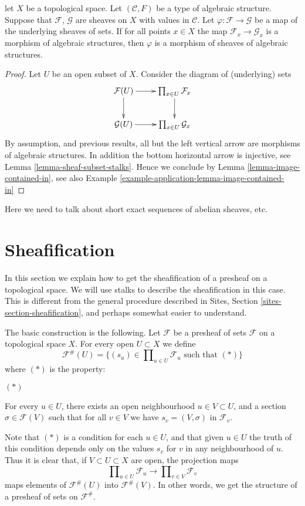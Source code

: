 \begin{lemma}
\label{lemma-check-homomorphism-stalks}
let $X$ be a topological space.
Let $(\mathcal{C}, F)$ be a type of algebraic structure.
Suppose that $\mathcal{F}$, $\mathcal{G}$ are sheaves on $X$
with values in $\mathcal{C}$.
Let $\varphi : \mathcal{F} \to \mathcal{G}$
be a map of the underlying sheaves of sets.
If for all points $x \in X$ the map
$\mathcal{F}_x \to \mathcal{G}_x$
is a morphism of algebraic structures,
then $\varphi$ is a morphism of sheaves of algebraic structures.
\end{lemma}

\begin{proof}
Let $U$ be an open subset of $X$. Consider the diagram of
(underlying) sets
$$
\xymatrix{
\mathcal{F}(U) \ar[r] \ar[d] &
\prod_{x \in U} \mathcal{F}_x \ar[d] \\
\mathcal{G}(U) \ar[r] &
\prod_{x \in U} \mathcal{G}_x
}
$$
By assumption, and previous results, all but the left vertical
arrow are morphisms of algebraic structures. In addition the
bottom horizontal arrow is injective,
see Lemma \ref{lemma-sheaf-subset-stalks}.
Hence we conclude by Lemma \ref{lemma-image-contained-in},
see also Example \ref{example-application-lemma-image-contained-in}
\end{proof}

\noindent
Here we need to talk about short exact sequences of abelian sheaves, etc.




\section{Sheafification}
\label{section-sheafification}

\noindent
In this section we explain how to get the sheafification
of a presheaf on a topological space. We will use stalks
to describe the sheafification in this case. This is different
from the general procedure described in Sites, Section
\ref{sites-section-sheafification}, and perhaps somewhat
easier to understand.

\medskip\noindent
The basic construction is the following. Let $\mathcal{F}$ be a presheaf
of sets $\mathcal{F}$ on a topological space $X$.
For every open $U \subset X$ we define
$$
\mathcal{F}^{\#}(U)
=
\{
(s_u) \in \prod\nolimits_{u \in U} \mathcal{F}_u
\text{ such that }(*)
\}
$$
where $(*)$ is the property:
\begin{list}{$(*)$}{}
\item For every $u \in U$, there exists an open neighbourhood
$u \in V \subset U$, and a section $\sigma \in \mathcal{F}(V)$
such that for all $v \in V$ we have $s_v = (V, \sigma)$
in $\mathcal{F}_v$.
\end{list}
Note that $(*)$ is a condition for each $u \in U$,
and that given $u \in U$ the truth of this condition
depends only on the values $s_v$ for $v$ in any neighbourhood
of $u$. Thus it is clear that,
if $V \subset U \subset X$ are open, the projection maps
$$
\prod\nolimits_{u \in U} \mathcal{F}_u
\longrightarrow
\prod\nolimits_{v \in V} \mathcal{F}_v
$$
maps elements of $\mathcal{F}^{\#}(U)$ into $\mathcal{F}^{\#}(V)$.
In other words, we get the structure of a presheaf of sets
on $\mathcal{F}^{\#}$. 

